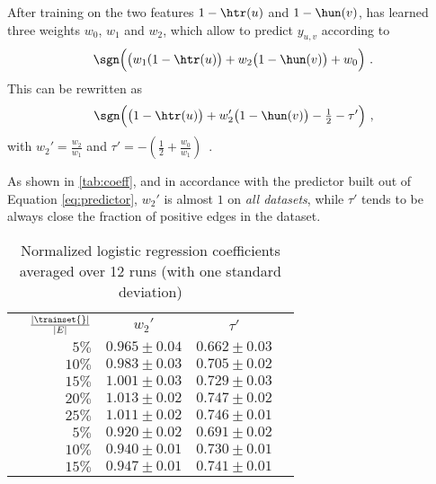 After training on the two features $1-\htr(u)$ and $1-\hun(v)$, \uslogregp{} has learned three
weights $w_0$, $w_1$ and $w_2$, which allow to predict $y_{u,v}$ according to 
\[ 
  \sgn\Big(\big(w_1(1-\htr(u)\big) + w_2 \big(1-\hun(v)\big) + w_0\Big)~.
\]
This can be rewritten as 
\[
\sgn\Big(\big(1-\htr(u)\big) + w_2'\big(1-\hun(v)\big) - \tfrac{1}{2} -\tau'\Big)~,
\]
with $w_2' = \frac{w_2}{w_1}$ and $\tau' = - \left(\frac{1}{2} + \frac{w_0}{w_1}\right)$~.
	
As shown in \autoref{tab:coeff}, and in accordance with the predictor built out of Equation
\eqref{eq:predictor}, $w_2'$ is almost $1$ on \emph{all datasets}, while $\tau'$ tends to be always
close the fraction of positive edges in the dataset.

\begin{table}[bt]
  \centering
  \caption{Normalized logistic regression coefficients averaged over 12 runs (with one standard
  deviation) \label{tab:coeff}}
  \small
  \begin{tabular}{lrccc}
    \toprule
    & $\frac{|\trainset{}|}{|E|}$ &              $w_2'$ & $\tau'$ \\
    \multirow{5}{*}{\aut{}} & $5\%$  &  $0.965 \pm 0.04$  &  $0.662 \pm 0.03$  \\
                            & $10\%$ &  $0.983 \pm 0.03$  &  $0.705 \pm 0.02$  \\
                            & $15\%$ &  $1.001 \pm 0.03$  &  $0.729 \pm 0.03$  \\
                            & $20\%$ &  $1.013 \pm 0.02$  &  $0.747 \pm 0.02$  \\
                            & $25\%$ &  $1.011 \pm 0.02$  &  $0.746 \pm 0.01$  \\
    \midrule
    \multirow{5}{*}{\wik{}} & $5\%$  &  $0.920 \pm 0.02$  &  $0.691 \pm 0.02$  \\
                            & $10\%$ &  $0.940 \pm 0.01$  &  $0.730 \pm 0.01$  \\
                            & $15\%$ &  $0.947 \pm 0.01$  &  $0.741 \pm 0.01$  \\

\end{tabular}
\end{table}

